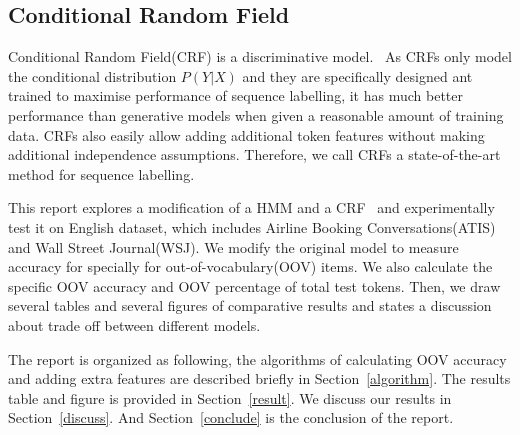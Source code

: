 \documentclass[journal, a4paper]{IEEEtran}
\begin{document}
\subsection{Conditional Random Field}
Conditional Random Field(CRF) is a discriminative model.~\cite{CRF01} As CRFs only model the conditional distribution $P(Y|X)$ and they are specifically designed ant trained to maximise performance of sequence labelling, it has much better performance than generative models when given a reasonable amount of training data. CRFs also easily allow adding additional token features without making additional independence assumptions. Therefore, we call CRFs a state-of-the-art method for sequence labelling.

This report explores a modification of a HMM and a CRF~\cite{MALLET} and experimentally test it on English dataset, which includes Airline Booking Conversations(ATIS) and Wall Street Journal(WSJ).  We modify the original model to measure accuracy for specially for out-of-vocabulary(OOV) items. We also calculate the specific OOV accuracy and OOV percentage of total test tokens. Then, we draw several tables and several figures of comparative results and states a discussion about trade off between different models.
	
The report is organized as following, the algorithms of calculating OOV accuracy and adding extra features are described briefly in Section~\ref{algorithm}. The results table and figure is provided in Section~\ref{result}. We discuss our results in Section~\ref{discuss}. And Section~\ref{conclude} is the conclusion of the report.

\end{document}

